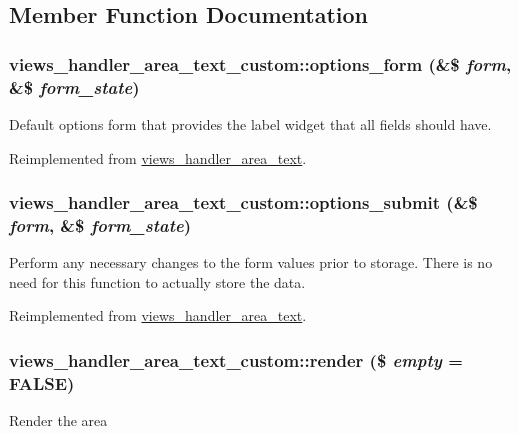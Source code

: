 \subsection{Member Function Documentation}
\hypertarget{classviews__handler__area__text__custom_a93eb91b0ea21ca78b68b5a4832cc9035}{
\subsubsection[{options\_\-form}]{\setlength{\rightskip}{0pt plus 5cm}views\_\-handler\_\-area\_\-text\_\-custom::options\_\-form (\&\$ {\em form}, \/  \&\$ {\em form\_\-state})}}
\label{classviews__handler__area__text__custom_a93eb91b0ea21ca78b68b5a4832cc9035}
Default options form that provides the label widget that all fields should have. 

Reimplemented from \hyperlink{classviews__handler__area__text_a2781ce4797304f2ce2a026820e0006fb}{views\_\-handler\_\-area\_\-text}.\hypertarget{classviews__handler__area__text__custom_a76f34efb470e6c03f7c67e655405e250}{
\subsubsection[{options\_\-submit}]{\setlength{\rightskip}{0pt plus 5cm}views\_\-handler\_\-area\_\-text\_\-custom::options\_\-submit (\&\$ {\em form}, \/  \&\$ {\em form\_\-state})}}
\label{classviews__handler__area__text__custom_a76f34efb470e6c03f7c67e655405e250}
Perform any necessary changes to the form values prior to storage. There is no need for this function to actually store the data. 

Reimplemented from \hyperlink{classviews__handler__area__text_a337ccf78771d5b61ba7ded71532f9b48}{views\_\-handler\_\-area\_\-text}.\hypertarget{classviews__handler__area__text__custom_a04acaaef479eb115b7912b963967387c}{
\subsubsection[{render}]{\setlength{\rightskip}{0pt plus 5cm}views\_\-handler\_\-area\_\-text\_\-custom::render (\$ {\em empty} = {\ttfamily FALSE})}}
\label{classviews__handler__area__text__custom_a04acaaef479eb115b7912b963967387c}
Render the area 

